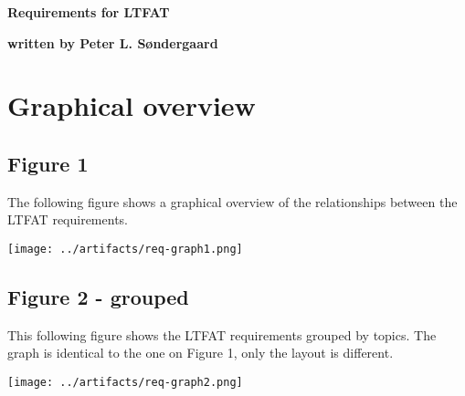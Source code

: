\documentclass{report}
\begin{document}
\thispagestyle{empty}

\mbox{}

\vfill

{\LARGE\textbf{Requirements for LTFAT}}

\vfill

{\Large\textbf{written by Peter L. S{\o}ndergaard}}

\vfill

\date{\today}

\vfill


\vfill

\newpage

\tableofcontents

\newpage

%



\chapter{Graphical overview}
\section{Figure 1}
The following figure shows a graphical overview of the relationships
between the LTFAT requirements.

\texttt{[image: ../artifacts/req-graph1.png]}

\section{Figure 2 - grouped}
This following figure shows the LTFAT requirements grouped by
topics. The graph is identical to the one on Figure 1, only the layout is
different.

\texttt{[image: ../artifacts/req-graph2.png]}
\end{document}
